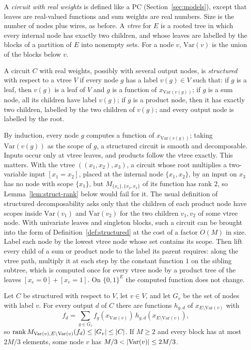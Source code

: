 A \emph{circuit with real weights} is defined like a PC (Section~\ref{sec:models}), except that leaves are real-valued functions and sum weights are real numbers. Size is the number of nodes plus wires, as before. A \emph{vtree} for $E$ is a rooted tree in which every internal node has exactly two children, and whose leaves are labelled by the blocks of a partition of $E$ into nonempty sets. For a node $v$, $\mathrm{Var}(v)$ is the union of the blocks below $v$.

\begin{definition}\label{def:structured}
A circuit $C$ with real weights, possibly with several output nodes, is \emph{structured} with respect to a vtree $V$ if every node $g$ has a label $v(g)\in V$ such that: if $g$ is a leaf, then $v(g)$ is a leaf of $V$ and $g$ is a function of $x_{\mathrm{Var}(v(g))}$; if $g$ is a sum node, all its children have label $v(g)$; if $g$ is a product node, then it has exactly two children, labelled by the two children of $v(g)$; and every output node is labelled by the root.
\end{definition}

By induction, every node $g$ computes a function of $x_{\mathrm{Var}(v(g))}$; taking $\mathrm{Var}(v(g))$ as the scope of $g$, a structured circuit is smooth and decomposable. Inputs occur only at vtree leaves, and products follow the vtree exactly. This matters. With the vtree $((x_1,x_2),x_3)$, a circuit whose root multiplies a two-variable input $[x_1=x_2]$, placed at the internal node $\{x_1,x_2\}$, by an input on $x_3$ has no node with scope $\{x_1\}$, but $M_{\{x_1\},\{x_2,x_3\}}$ of its function has rank $2$, so Lemma~\ref{lem:struct-rank} below would fail for it. The usual definition of structured decomposability asks only that the children of each product node have scopes inside $\mathrm{Var}(v_1)$ and $\mathrm{Var}(v_2)$ for the two children $v_1,v_2$ of some vtree node. With univariate leaves and singleton blocks, such a circuit can be brought into the form of Definition~\ref{def:structured} at the cost of a factor $O(M)$ in size. Label each node by the lowest vtree node whose set contains its scope. Then lift every child of a sum or product node to the label its parent requires: along the vtree path, multiply it at each step by the constant function $1$ on the sibling subtree, which is computed once for every vtree node by a product tree of the leaves $[x_e=0]+[x_e=1]$. On $\{0,1\}^E$ the computed function does not change.

\begin{lemma}\label{lem:struct-rank}
Let $C$ be structured with respect to $V$, let $v\in V$, and let $G_v$ be the set of nodes with label $v$. For every output $d$ of $C$ there are functions $h_{g,d}$ of $x_{E\setminus\mathrm{Var}(v)}$ with
\[
  f_d=\sum_{g\in G_v}f_g(x_{\mathrm{Var}(v)})\,h_{g,d}(x_{E\setminus\mathrm{Var}(v)}),
\]
so $\operatorname{rank}M_{\mathrm{Var}(v),E\setminus\mathrm{Var}(v)}(f_d)\le\lvert G_v\rvert\le\lvert C\rvert$. If $M\ge2$ and every block has at most $2M/3$ elements, some node $v$ has $M/3<\lvert \mathrm{Var}(v)\rvert\le2M/3$.
\end{lemma}

